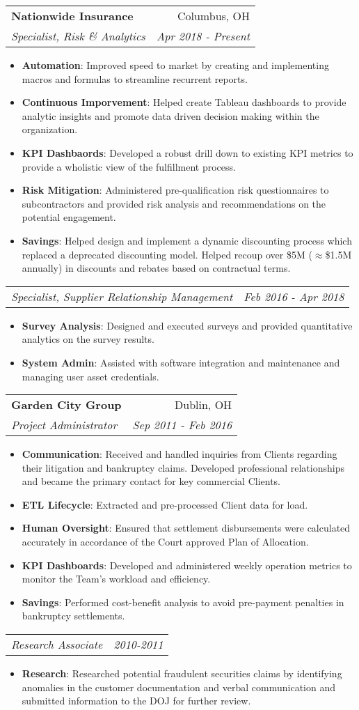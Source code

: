 \documentclass[letterpaper,11pt]{article}
\makeatletter
\newcommand{\resumeItem}[2]{
  \item\small{
    \textbf{#1}{: #2 \vspace{-2pt}}
  }
}
\newcommand{\resumeSubheading}[4]{
  \vspace{-1pt}\item
    \begin{tabular*}{0.97\textwidth}[t]{l@{\extracolsep{\fill}}r}
      \textbf{#1} & #2 \\
      \textit{\small#3} & \textit{\small #4} \\
    \end{tabular*}\vspace{-5pt}
}
\newcommand{\resumeSubSubheading}[2]{
    \begin{tabular*}{0.97\textwidth}[t]{l@{\extracolsep{\fill}}r}
      \textit{\small#1} & \textit{\small #2} \\
    \end{tabular*}\vspace{-5pt}
}
\newcommand{\resumeItemListStart}{\begin{itemize}}
\newcommand{\resumeItemListEnd}{\end{itemize}\vspace{-5pt}}
\makeatother
\begin{document}
    \resumeSubheading
      {Nationwide Insurance}{Columbus, OH}
      {Specialist, Risk \& Analytics}{Apr 2018 - Present}
      \resumeItemListStart
        \resumeItem{Automation}
          {Improved speed to market by creating and implementing macros and formulas to streamline recurrent reports.}
        \resumeItem{Continuous Imporvement}
          {Helped create Tableau dashboards to provide analytic insights and promote data driven decision making within the organization.}
        \resumeItem{KPI Dashbaords}
          {Developed a robust drill down to existing KPI metrics to provide a wholistic view of the fulfillment process.}
        \resumeItem{Risk Mitigation}
          {Administered pre-qualification risk questionnaires to subcontractors and provided risk analysis and recommendations on the potential engagement.}
        \resumeItem{Savings}
          {Helped design and implement a dynamic discounting process which replaced a deprecated discounting model. Helped recoup over \$5M ($\approx$\$1.5M annually) in discounts and rebates based on contractual terms.}        
          \resumeItemListEnd
    \resumeSubSubheading
      {Specialist, Supplier Relationship Management}{Feb 2016 - Apr 2018}
      \resumeItemListStart
        \resumeItem{Survey Analysis}
          {Designed and executed surveys and provided quantitative analytics on the survey results.}
        \resumeItem{System Admin}
          {Assisted with software integration and maintenance and managing user asset credentials.}
        \resumeItemListEnd
   
    \resumeSubheading
      {Garden City Group}{Dublin, OH}
      {Project Administrator}{Sep 2011 - Feb 2016}
      \resumeItemListStart
        \resumeItem{Communication}
          {Received and handled inquiries from Clients regarding their litigation and bankruptcy claims. Developed professional relationships and became the primary contact for key commercial Clients.}
        \resumeItem{ETL Lifecycle}
          {Extracted and pre-processed Client data for load.}
        \resumeItem{Human Oversight}
          {Ensured that settlement disbursements were calculated accurately in accordance of the Court approved Plan of Allocation.}
        \resumeItem{KPI Dashboards}
          {Developed and administered weekly operation metrics to monitor the Team's workload and efficiency.}
        \resumeItem{Savings}
          {Performed cost-benefit analysis to avoid pre-payment penalties in bankruptcy settlements.}
        \resumeItemListEnd
    \resumeSubSubheading
      {Research Associate}{2010-2011}
      \resumeItemListStart
        \resumeItem{Research}
          {Researched potential fraudulent securities claims by identifying anomalies in the customer documentation and verbal communication and submitted information to the DOJ for further review.}
      \resumeItemListEnd
\end{document}
